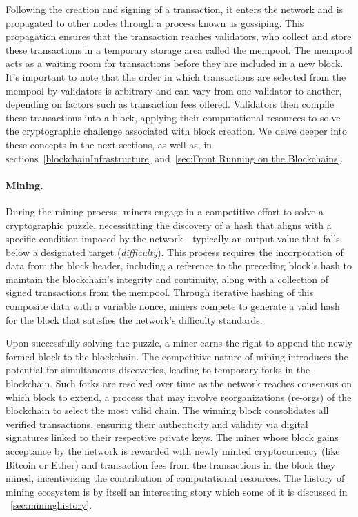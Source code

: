Following the creation and signing of a transaction, it enters the network and is propagated to other nodes through a process known as gossiping. This propagation ensures that the transaction reaches validators, who collect and store these transactions in a temporary storage area called the mempool. The mempool acts as a waiting room for transactions before they are included in a new block. It's important to note that the order in which transactions are selected from the mempool by validators is arbitrary and can vary from one validator to another, depending on factors such as transaction fees offered. Validators then compile these transactions into a block, applying their computational resources to solve the cryptographic challenge associated with block creation. We delve deeper into these concepts in the next sections, as well as, in sections~\ref{blockchainInfrastructure} and~\ref{sec:Front Running on the Blockchains}.


\paragraph{Mining.}
During the mining process, miners engage in a competitive effort to solve a cryptographic puzzle, necessitating the discovery of a hash that aligns with a specific condition imposed by the network—typically an output value that falls below a designated target (\textit{difficulty}). This process requires the incorporation of data from the block header, including a reference to the preceding block's hash to maintain the blockchain's integrity and continuity, along with a collection of signed transactions from the mempool. Through iterative hashing of this composite data with a variable nonce, miners compete to generate a valid hash for the block that satisfies the network's difficulty standards.

Upon successfully solving the puzzle, a miner earns the right to append the newly formed block to the blockchain. The competitive nature of mining introduces the potential for simultaneous discoveries, leading to temporary forks in the blockchain. Such forks are resolved over time as the network reaches consensus on which block to extend, a process that may involve reorganizations (re-orgs) of the blockchain to select the most valid chain. The winning block consolidates all verified transactions, ensuring their authenticity and validity via digital signatures linked to their respective private keys. The miner whose block gains acceptance by the network is rewarded with newly minted cryptocurrency (like Bitcoin or Ether) and transaction fees from the transactions in the block they mined, incentivizing the contribution of computational resources. The history of mining ecosystem is by itself an interesting story which some of it is discussed in ~\ref{sec:mininghistory}.

